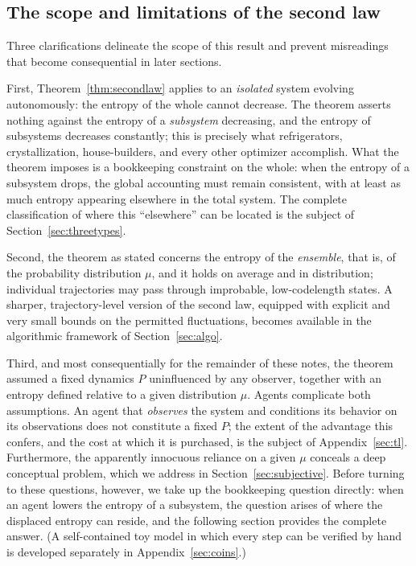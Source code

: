 \documentclass[11pt]{article}
\begin{document}
\subsection{The scope and limitations of the second law}
\label{sec:forbids}

Three clarifications delineate the scope of this result and prevent misreadings that become consequential in later sections.

First, Theorem~\ref{thm:secondlaw} applies to an \emph{isolated} system evolving autonomously: the entropy of the whole cannot decrease. The theorem asserts nothing against the entropy of a \emph{subsystem} decreasing, and the entropy of subsystems decreases constantly; this is precisely what refrigerators, crystallization, house-builders, and every other optimizer accomplish. What the theorem imposes is a bookkeeping constraint on the whole: when the entropy of a subsystem drops, the global accounting must remain consistent, with at least as much entropy appearing elsewhere in the total system. The complete classification of where this ``elsewhere'' can be located is the subject of Section~\ref{sec:threetypes}.

Second, the theorem as stated concerns the entropy of the \emph{ensemble}, that is, of the probability distribution $\mu$, and it holds on average and in distribution; individual trajectories may pass through improbable, low-codelength states. A sharper, trajectory-level version of the second law, equipped with explicit and very small bounds on the permitted fluctuations, becomes available in the algorithmic framework of Section~\ref{sec:algo}.

Third, and most consequentially for the remainder of these notes, the theorem assumed a fixed dynamics $P$ uninfluenced by any observer, together with an entropy defined relative to a given distribution $\mu$. Agents complicate both assumptions. An agent that \emph{observes} the system and conditions its behavior on its observations does not constitute a fixed $P$; the extent of the advantage this confers, and the cost at which it is purchased, is the subject of Appendix~\ref{sec:tl}. Furthermore, the apparently innocuous reliance on a given $\mu$ conceals a deep conceptual problem, which we address in Section~\ref{sec:subjective}. Before turning to these questions, however, we take up the bookkeeping question directly: when an agent lowers the entropy of a subsystem, the question arises of where the displaced entropy can reside, and the following section provides the complete answer. (A self-contained toy model in which every step can be verified by hand is developed separately in Appendix~\ref{sec:coins}.)
\end{document}
